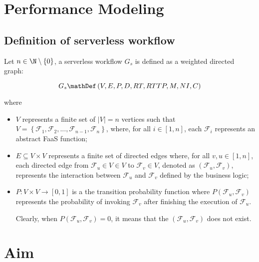 \section{Performance Modeling}

\subsection{Definition of serverless workflow}

Let $n \in \N \setminus \left\lbrace 0 \right\rbrace $, a serverless workflow $G_s$ is defined as a weighted directed graph:

\begin{equation}
G_s \mathDef \left( V, E, P, D, RT, RT T P, M, NI, C \right)  
\end{equation}

where

\begin{itemize}
	\item $V$ represents a finite set of $|V| = n$ vertices such that $V = \left\lbrace \mathscr{F}_1, \mathscr{F}_2, ..., \mathscr{F}_{n-1}, \mathscr{F}_n \right\rbrace $, where, for all $i \in \left[ 1, n \right] $, each $\mathscr{F}_i$ represents an abstract FaaS function;
	
	\item $E \subseteq V \times V $ represents a finite set of directed edges where, for all $v,u \in \left[ 1, n \right]$, each directed edge from $\mathscr{F}_u \in V \in V$ to $\mathscr{F}_v \in V$, denoted as $\left( \mathscr{F}_u, \mathscr{F}_v \right)$, represents the interaction between $\mathscr{F}_u$ and $\mathscr{F}_v$ defined by the business logic;
	
	\item $P : V \times V \to \left[  0, 1 \right]$ is a the transition probability function where $P\left(\mathscr{F}_u, \mathscr{F}_v \right) $ represents the probability of invoking
	$\mathscr{F}_v$ after finishing the execution of $\mathscr{F}_u$. 
	
	Clearly, when $P\left(\mathscr{F}_u, \mathscr{F}_v \right) = 0$, it means that the $\left( \mathscr{F}_u, \mathscr{F}_v \right)$ does not exist.
	
\end{itemize}

\newpage
\section{Aim}

